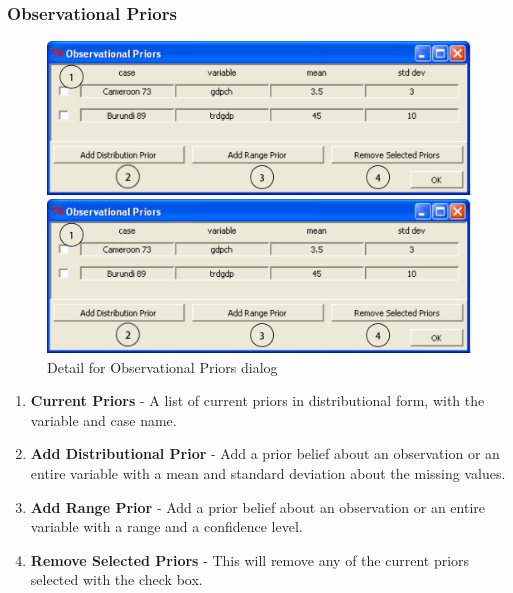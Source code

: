 \documentclass[12pt,titlepage]{article}
\begin{document}
\subsubsection{Observational Priors}\label{sec:refobspri}
\begin{figure}[h]
  \centering
  \begin{htmlonly} 
    \includegraphics[scale=1]{obsprior} 
  \end{htmlonly}
  \begin{latexonly}
    \includegraphics[scale=.75]{obsprior}
  \end{latexonly}
  \caption{Detail for Observational Priors dialog}
\end{figure}
\begin{enumerate}
\item \textbf{Current Priors} - A list of current priors in distributional
  form, with the variable and case name.  
\item \textbf{Add Distributional Prior} - Add a prior belief about an
  observation or an entire variable with a mean and standard deviation about the
  missing values.  
\item \textbf{Add Range Prior} - Add a prior belief about an observation or an
  entire variable with a range and a confidence level.  
\item \textbf{Remove Selected Priors} - This will remove any of the current
  priors selected with the check box.  
\end{enumerate}
\end{document}
